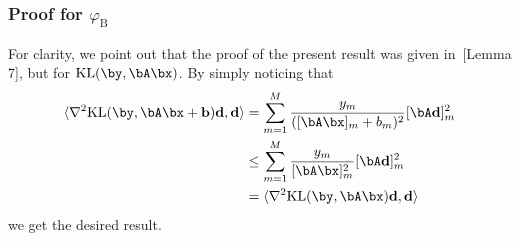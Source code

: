 \documentclass[11pt]{amsart}
\newcommand{\es}[1]{{\color{blue}#1}}
\begin{document}
\subsubsection{\texorpdfstring{Proof for $\varphi_\mathrm{B}$}{varphi=Burg}}
For clarity, we point out that the proof of the present result was given in~\cite{bauschke2017descent}[Lemma 7], but for $\mathrm{KL}(\by,\bA\bx)$. By simply noticing that
$$
\begin{aligned}
\langle \nabla^2\mathrm{KL}(\by,\bA\bx+\mathbf{b})\mathbf{d},\mathbf{d} \rangle&=\sum_{m=1}^M \frac{y_m}{([\bA \bx]_m+b_m)^2} [\bA \mathbf{d}]_m^2\\
&\leq \sum_{m=1}^M \frac{y_m}{[\bA \bx]_m^2} [\bA \mathbf{d}]_m^2\\
&= \langle \nabla^2\mathrm{KL}(\by,\bA\bx)\mathbf{d},\mathbf{d} \rangle
\end{aligned}
$$
we get the desired result.

\end{document}
